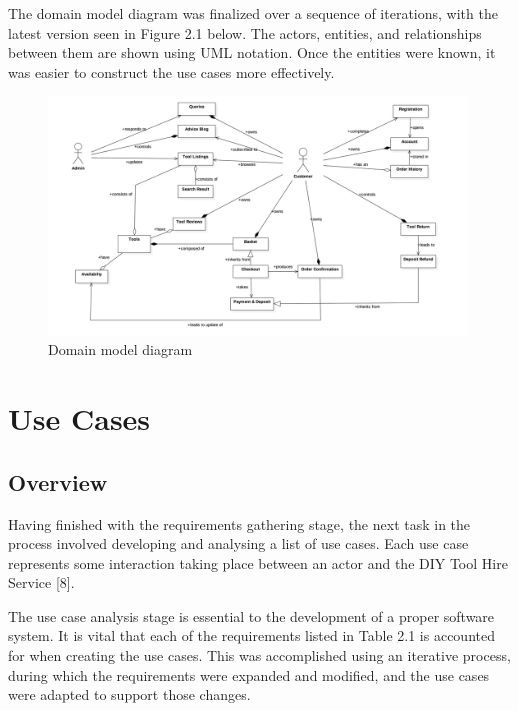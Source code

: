 The domain model diagram was finalized over a sequence of iterations,
with the latest version seen in Figure 2.1 below. The actors, entities,
and relationships between them are shown using UML notation. Once the
entities were known, it was easier to construct the use cases more
effectively.

\begin{figure}[H]
      \centering
      \includegraphics[trim = 0 0 0 0, clip, width=0.99\textwidth]{TempImg/domain.png}
      \caption{Domain model diagram}
 \end{figure}

\newpage

\hypertarget{use-cases}{%
\section{Use Cases}\label{use-cases}}

\hypertarget{overview-1}{%
\subsection{Overview}\label{overview-1}}

Having finished with the requirements gathering stage, the next task in
the process involved developing and analysing a list of use cases. Each
use case represents some interaction taking place between an actor and
the DIY Tool Hire Service {[}8{]}.

The use case analysis stage is essential to the development of a proper
software system. It is vital that each of the requirements listed in
Table 2.1 is accounted for when creating the use cases. This was
accomplished using an iterative process, during which the requirements
were expanded and modified, and the use cases were adapted to support
those changes.

